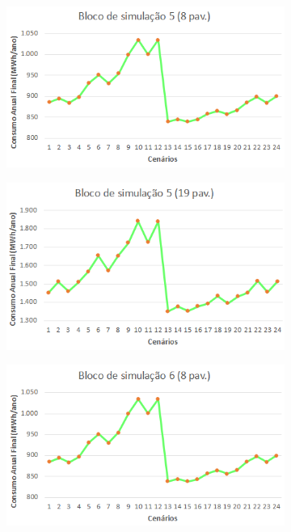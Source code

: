 \begin{figure}[H]
    \centering
    \caption{Gráficos dos blocos de simulação de paredes, 3, e coberturas, 4, dos modelos genéricos de 8 (esq.) e 19 pavimentos (dir.).}
    \begin{subfigure}[b]{0.49\textwidth}
        \includegraphics[width=\textwidth]{figures/result/fig29-bloco5.png}
    \end{subfigure}
    \begin{subfigure}[b]{0.49\textwidth}
        \includegraphics[width=\textwidth]{figures/result/fig30-bloco5.png}
    \end{subfigure}
    \begin{subfigure}[b]{0.49\textwidth}
        \includegraphics[width=\textwidth]{figures/result/fig31-bloco6.png}

\end{subfigure}
\end{figure}
